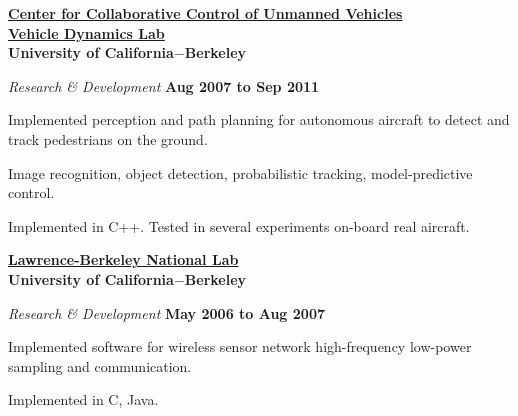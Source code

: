 \href{http://c3uv.berkeley.edu/}{\textbf{Center for Collaborative Control of Unmanned Vehicles}}\\
\href{http://vehicle.me.berkeley.edu/}{\textbf{Vehicle Dynamics Lab}}\\
\textbf{University of California$-$Berkeley}
\begin{outerlist}
\item[] \textit{Research \& Development}%
        \hfill \textbf{Aug 2007 to Sep 2011}
\begin{innerlist}
\item Implemented perception and path planning for autonomous aircraft to detect and track pedestrians on the ground.
\item Image recognition, object detection, probabilistic tracking, model-predictive control.
\item Implemented in C++. Tested in several experiments on-board real aircraft.
\end{innerlist}
\end{outerlist}

\halfblankline

\href{http://www.lbl.gov/}{\textbf{Lawrence-Berkeley National Lab}}\\
\textbf{University of California$-$Berkeley}
\begin{outerlist}
\item[] \textit{Research \& Development}%
        \hfill \textbf{May 2006 to Aug 2007}
\begin{innerlist}
\item Implemented software for wireless sensor network high-frequency low-power sampling and communication.
\item Implemented in C, Java.
\end{innerlist}
\end{outerlist}

